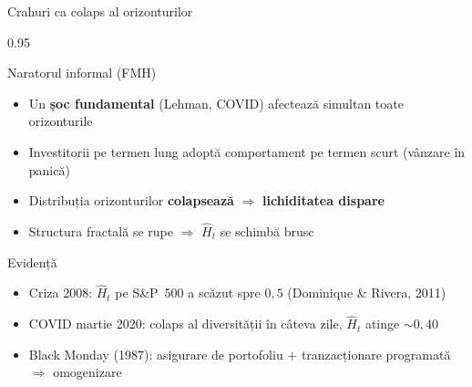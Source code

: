 \documentclass[9pt, aspectratio=169, t]{beamer}
\begin{document}
\begin{frame}[shrink=15]{Crahuri ca colaps al orizonturilor}
\begin{cminipage}{0.95\textwidth}
\begin{block}{Naratorul informal (FMH)}
\begin{itemize}\setlength{\itemsep}{2pt}
    \item Un \textbf{șoc fundamental} (Lehman, COVID) afectează simultan toate orizonturile
    \item Investitorii pe termen lung adoptă comportament pe termen scurt (vânzare în panică)
    \item Distribuția orizonturilor \textbf{colapsează} $\Rightarrow$ \textbf{lichiditatea dispare}
    \item Structura fractală se rupe $\Rightarrow$ $\hat{H}_t$ se schimbă brusc
\end{itemize}
\end{block}
\begin{exampleblock}{Evidență}
\begin{itemize}\setlength{\itemsep}{0pt}
    \item Criza 2008: $\hat{H}_t$ pe S\&P~500 a scăzut spre $0{,}5$ (Dominique \& Rivera, 2011)
    \item COVID martie 2020: colaps al diversității în câteva zile, $\hat{H}_t$ atinge $\sim 0{,}40$
    \item Black Monday (1987): asigurare de portofoliu $+$ tranzacționare programată $\Rightarrow$ omogenizare
\end{itemize}
\end{exampleblock}
\end{cminipage}
\end{frame}
\end{document}
